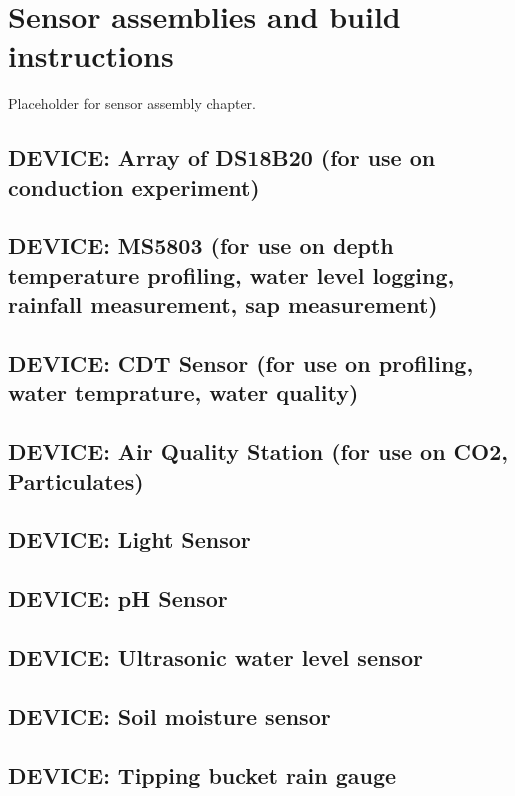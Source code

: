 \setchapterpreamble[u]{\margintoc}
\chapter{\color{gray}Sensor assemblies and build instructions \color{black}}

Placeholder for sensor assembly chapter.

\section{\color{gray} DEVICE: Array of DS18B20 (for use on conduction experiment) \color{black}}

\section{\color{gray} DEVICE: MS5803 (for use on depth temperature profiling, water level logging, rainfall measurement, sap measurement) \color{black}}

\section{\color{gray} DEVICE: CDT Sensor (for use on profiling, water temprature, water quality) \color{black}}

\section{\color{gray} DEVICE: Air Quality Station (for use on CO2, Particulates) \color{black}}

\section{\color{gray} DEVICE: Light Sensor \color{black}}

\section{\color{gray} DEVICE: pH Sensor \color{black}}

\section{\color{gray} DEVICE: Ultrasonic water level sensor \color{black}}

\section{\color{gray} DEVICE: Soil moisture sensor \color{black}}

\section{\color{gray} DEVICE: Tipping bucket rain gauge \color{black}}
